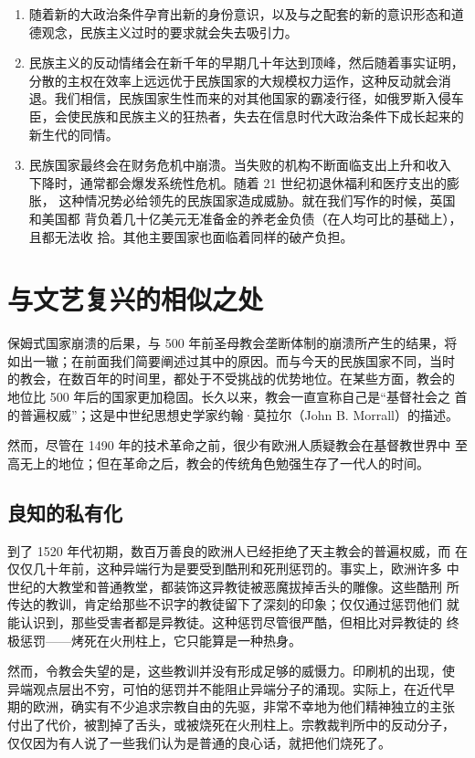 \begin{enumerate}
\begin{itemize}
    \end{itemize}
    \item 随着新的大政治条件孕育出新的身份意识，以及与之配套的新的意识形态和道德观念，民族主义过时的要求就会失去吸引力。
    \item 民族主义的反动情绪会在新千年的早期几十年达到顶峰，然后随着事实证明，分散的主权在效率上远远优于民族国家的大规模权力运作，这种反动就会消退。我们相信，民族国家生性而来的对其他国家的霸凌行径，如俄罗斯入侵车臣，会使民族和民族主义的狂热者，失去在信息时代大政治条件下成长起来的新生代的同情。
    \item 民族国家最终会在财务危机中崩溃。当失败的机构不断面临支出上升和收入 下降时，通常都会爆发系统性危机。随着 21 世纪初退休福利和医疗支出的膨胀， 这种情况势必给领先的民族国家造成威胁。就在我们写作的时候，英国和美国都 背负着几十亿美元无准备金的养老金负债（在人均可比的基础上），且都无法收 拾。其他主要国家也面临着同样的破产负担。
\end{enumerate}


\section{与文艺复兴的相似之处}
保姆式国家崩溃的后果，与 500 年前圣母教会垄断体制的崩溃所产生的结果，将 如出一辙；在前面我们简要阐述过其中的原因。而与今天的民族国家不同，当时 的教会，在数百年的时间里，都处于不受挑战的优势地位。在某些方面，教会的 地位比 500 年后的国家更加稳固。长久以来，教会一直宣称自己是“基督社会之 首的普遍权威”；这是中世纪思想史学家约翰·莫拉尔（John B. Morrall）的描述。

然而，尽管在 1490 年的技术革命之前，很少有欧洲人质疑教会在基督教世界中 至高无上的地位；但在革命之后，教会的传统角色勉强生存了一代人的时间。

\subsection{良知的私有化}

到了 1520 年代初期，数百万善良的欧洲人已经拒绝了天主教会的普遍权威，而 在仅仅几十年前，这种异端行为是要受到酷刑和死刑惩罚的。事实上，欧洲许多 中世纪的大教堂和普通教堂，都装饰这异教徒被恶魔拔掉舌头的雕像。这些酷刑 所传达的教训，肯定给那些不识字的教徒留下了深刻的印象；仅仅通过惩罚他们 就能认识到，那些受害者都是异教徒。这种惩罚尽管很严酷，但相比对异教徒的 终极惩罚——烤死在火刑柱上，它只能算是一种热身。

然而，令教会失望的是，这些教训并没有形成足够的威慑力。印刷机的出现，使 异端观点层出不穷，可怕的惩罚并不能阻止异端分子的涌现。实际上，在近代早 期的欧洲，确实有不少追求宗教自由的先驱，非常不幸地为他们精神独立的主张 付出了代价，被割掉了舌头，或被烧死在火刑柱上。宗教裁判所中的反动分子， 仅仅因为有人说了一些我们认为是普通的良心话，就把他们烧死了。

